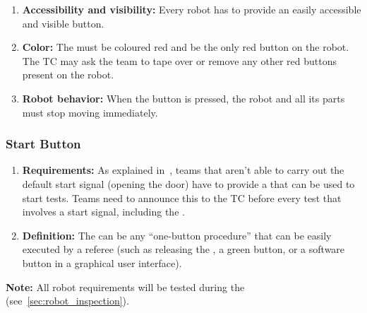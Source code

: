 \begin{enumerate}
	\item \textbf{Accessibility and visibility:} Every robot has to provide an easily accessible and visible \EmergencyStop{} button.
	\item \textbf{Color:} The \EmergencyStop{} must be coloured red and be the only red button on the robot.
	The TC may ask the team to tape over or remove any other red buttons present on the robot.
	\item \textbf{Robot behavior:} When the \EmergencyStop{} button is pressed, the robot and all its parts must stop moving immediately.
\end{enumerate}

\subsubsection{Start Button}
\label{rule:start_button}

\begin{enumerate}
	\item \textbf{Requirements:} As explained in~, teams that aren't able to carry out the default start signal (opening the door) have to provide a \StartButton{} that can be used to start tests.
	Teams need to announce this to the TC before every test that involves a start signal, including the \RobotInspection{}.
	\item \textbf{Definition:} The \StartButton{} can be any \enquote{one-button procedure} that can be easily executed by a referee (such as releasing the \EmergencyStop{}, a green button, or a software button in a graphical user interface).
\end{enumerate}

\noindent\textbf{Note:} All robot requirements will be tested during the \RobotInspection{} (see~\ref{sec:robot_inspection}).


